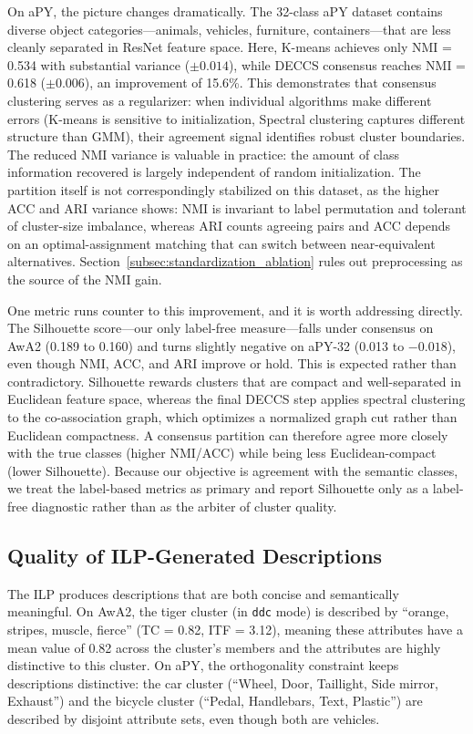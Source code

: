 On aPY, the picture changes dramatically. The 32-class aPY dataset contains diverse object categories---animals, vehicles, furniture, containers---that are less cleanly separated in ResNet feature space. Here, K-means achieves only NMI = 0.534 with substantial variance ($\pm 0.014$), while DECCS consensus reaches NMI = 0.618 ($\pm 0.006$), an improvement of 15.6\%. This demonstrates that consensus clustering serves as a regularizer: when individual algorithms make different errors (K-means is sensitive to initialization, Spectral clustering captures different structure than GMM), their agreement signal identifies robust cluster boundaries. The reduced NMI variance is valuable in practice: the amount of class information recovered is largely independent of random initialization. The partition itself is not correspondingly stabilized on this dataset, as the higher ACC and ARI variance shows: NMI is invariant to label permutation and tolerant of cluster-size imbalance, whereas ARI counts agreeing pairs and ACC depends on an optimal-assignment matching that can switch between near-equivalent alternatives. Section~\ref{subsec:standardization_ablation} rules out preprocessing as the source of
the NMI gain.

One metric runs counter to this improvement, and it is worth addressing directly. The Silhouette score---our only label-free measure---falls under consensus on AwA2 (0.189 to 0.160) and turns slightly negative on aPY-32 (0.013 to $-0.018$), even though NMI, ACC, and ARI improve or hold. This is expected rather than contradictory. Silhouette rewards clusters that are compact and well-separated in Euclidean feature space, whereas the final DECCS step applies spectral clustering to the co-association graph, which optimizes a normalized graph cut rather than Euclidean compactness. A consensus partition can therefore agree more closely with the true classes (higher NMI/ACC) while being less Euclidean-compact (lower Silhouette). Because our objective is agreement with the semantic classes, we treat the label-based metrics as primary and report Silhouette only as a label-free diagnostic rather than as the arbiter of cluster quality.

\subsection{Quality of ILP-Generated Descriptions}

The ILP produces descriptions that are both concise and semantically meaningful. On AwA2, the tiger cluster (in \texttt{ddc} mode) is described by ``orange, stripes, muscle, fierce'' (TC = 0.82, ITF = 3.12), meaning these attributes have a mean value of 0.82 across the cluster's members and the attributes are highly distinctive to this cluster. On aPY, the orthogonality constraint keeps descriptions distinctive: the car cluster (``Wheel, Door, Taillight, Side mirror, Exhaust'') and the bicycle cluster (``Pedal, Handlebars, Text, Plastic'') are described by disjoint attribute sets, even though both are vehicles.

